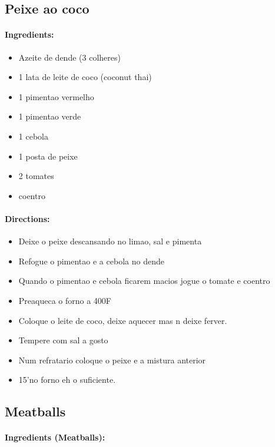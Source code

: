 \documentclass{article}
\begin{document}
\subsection{Peixe ao coco}

\paragraph{Ingredients:}

\begin{itemize}
	\item Azeite de dende (3 colheres)
	\item 1 lata de leite de coco (coconut thai)
	\item 1 pimentao vermelho
	\item 1 pimentao verde
	\item 1 cebola
	\item 1 posta de peixe
	\item 2 tomates
	\item coentro
\end{itemize}

\paragraph{Directions:}
\begin{itemize}
	\item Deixe o peixe descansando no limao, sal e pimenta
	\item Refogue o pimentao e a cebola no dende
	\item Quando o pimentao e cebola ficarem macios jogue o tomate e coentro
	\item Preaqueca o forno a 400F
	\item Coloque o leite de coco, deixe aquecer mas n deixe ferver. 
	\item Tempere com sal a gosto
	\item Num refratario coloque o peixe e a mistura anterior
	\item 15'no forno eh o suficiente.
\end{itemize} 

\subsection{Meatballs}

\paragraph{Ingredients (Meatballs):}
\end{document}
